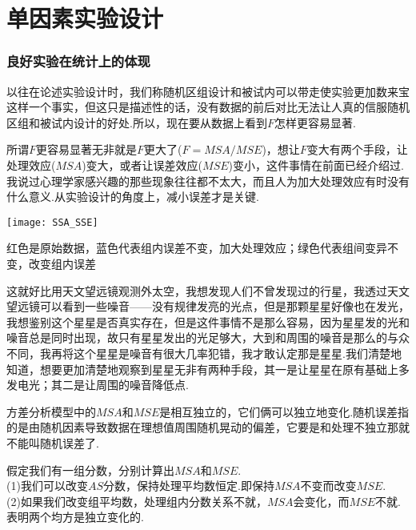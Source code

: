 \setchapterpreamble[u]{\margintoc}
\chapter{单因素实验设计}

\subsection{良好实验在统计上的体现}
以往在论述实验设计时，我们称随机区组设计和被试内可以带走使实验更加数来宝这样一个事实，但这只是描述性的话，没有数据的前后对比无法让人真的信服随机区组和被试内设计的好处.所以，现在要从数据上看到$F$怎样更容易显著.

所谓$F$更容易显著无非就是$F$更大了($F=MSA/MSE$)，想让$F$变大有两个手段，让处理效应($MSA$)变大，或者让误差效应($MSE$)变小，这件事情在前面已经介绍过.我说过心理学家感兴趣的那些现象往往都不太大，而且人为加大处理效应有时没有什么意义.从实验设计的角度上，减小误差才是关键.

\begin{marginfigure}
	\texttt{[image: SSA\_SSE]}
	\caption{红色是原始数据，蓝色代表组内误差不变，加大处理效应；绿色代表组间变异不变，改变组内误差}
\end{marginfigure}

这就好比用天文望远镜观测外太空，我想发现人们不曾发现过的行星，我透过天文望远镜可以看到一些噪音——没有规律发亮的光点，但是那颗星星好像也在发光，我想鉴别这个星星是否真实存在，但是这件事情不是那么容易，因为星星发的光和噪音总是同时出现，故只有星星发出的光足够大，大到和周围的噪音是那么的与众不同，我再将这个星星是噪音有很大几率犯错，我才敢认定那是星星.我们清楚地知道，想要更加清楚地观察到星星无非有两种手段，其一是让星星在原有基础上多发电光；其二是让周围的噪音降低点.

方差分析模型中的$MSA$和$MSE$是相互独立的，它们俩可以独立地变化.随机误差指的是由随机因素导致数据在理想值周围随机晃动的偏差，它要是和处理不独立那就不能叫随机误差了.

\begin{kaobox}[frametitle=思考]
假定我们有一组分数，分别计算出$MSA$和$MSE$.\\
(1)我们可以改变$AS$分数，保持处理平均数恒定.即保持$MSA$不变而改变$MSE$.\\
(2)如果我们改变组平均数，处理组内分数关系不就，$MSA$会变化，而$MSE$不就.表明两个均方是独立变化的.



\end{kaobox}

